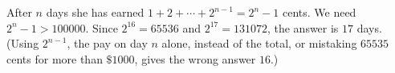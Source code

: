 After $n$ days she has earned $1+2+\cdots+2^{n-1}=2^n-1$ cents. We need $2^n-1>100000$. Since $2^{16}=65536$ and $2^{17}=131072$, the answer is $\boxed{17}$ days. (Using $2^{n-1}$, the pay on day $n$ alone, instead of the total, or mistaking $65535$ cents for more than $\$1000$, gives the wrong answer $16$.)
